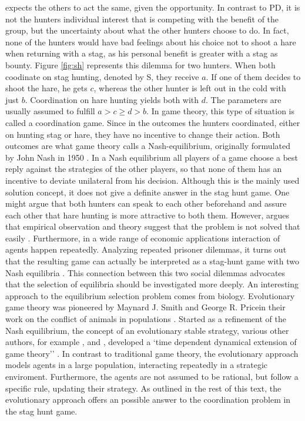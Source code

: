 \documentclass[11pt]{article}
\begin{document}
expects the others to act the same, given the opportunity. In contrast
to PD, it is not the hunters individual interest that is competing with the
benefit of the group, but the uncertainty about what the other hunters choose
to do. In fact, none of the hunters would have bad feelings about his choice
not to shoot a hare when returning with a stag, as his personal benefit is 
greater with a stag as bounty. Figure \ref{fig:sh} represents this dilemma 
for two hunters. When both coodinate on stag hunting, denoted by S, they receive 
$a$. If one of them decides to shoot the hare, he gets $c$, whereas
the other hunter is left out in the cold with just $b$. Coordination on hare
hunting yields both with $d$. The parameters are usually assumed to fulfill
$a > c \geq d >b$. In game theory, this type of situation is called
a coordination game. Since in the outcomes the hunters coordinated, either
on hunting stag or hare, they have no incentive to change their action. 
Both outcomes are what game theory calls a Nash-equilibrium, originally
formulated by John Nash in 1950 \parencite{nash_equilibrium_1950}. In a 
Nash equilibrium all players of a game choose a best reply against
the strategies of the other players, so that none of them has an incentive
to deviate unilateral from his decision. Although this is the mainly used
solution concept, it does not give a definite answer in the stag hunt game.
One might argue that both hunters can speak to each other beforehand and
assure each other that hare hunting is more attractive to both them. However,
argues that empirical observation and theory suggest that the problem is 
not solved that easily \parencite[337]{camerer_behavioral_2003}. 
Furthermore, in a wide range of economic applications interaction of agents
happen repeatedly. Analyzing repeated prisoner dilemmas, it turns 
out that the resulting game can actually be interpreted as a stag-hunt game with
two Nash equilibria \parencite{skyrms_stag_2004}.
This connection between this two social dilemmas advocates that
the selection of equilibria should be investigated more deeply. 
An interesting approach to the equilibrium selection problem comes from
biology. Evolutionary game theory was pioneered by Maynard J. Smith and George
R. Pricein their work on the conflict of animals in populations 
\parencite{smith_lhe_1973}. Started as a refinement of the Nash equilibrium,
the concept of an evolutionary stable strategy, various other authors, for 
example \textcite{taylor_evolutionary_1978}, \textcite{hofbauer_note_1979} and
\textcite{zeeman_dynamics_1981}, developed a `time dependent dynamical
extension of game theory'' \parencite[55]{hanauske_evolutionare_2011}.
In contrast to traditional game theory, the evolutionary approach  models
 agents in a large population, interacting repeatedly in a strategic enviroment. 
Furthermore, the agents are not assumed to be rational, but follow a specific 
rule, updating their strategy. 
As outlined in the rest of this text, the
evolutionary approach offers an possible answer to the coordination
problem in the stag hunt game.
\end{document}
